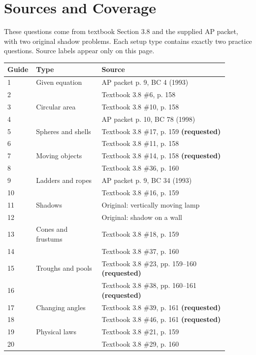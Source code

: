 \documentclass[11pt]{article}
\begin{document}
\section*{Sources and Coverage}
These questions come from textbook Section 3.8 and the supplied AP packet, with two original shadow problems. Each setup type contains exactly two practice questions. Source labels appear only on this page.
\par\medskip
\renewcommand{\arraystretch}{1.4}
\begin{tabular}{@{}p{0.07\linewidth}p{0.28\linewidth}p{0.54\linewidth}@{}}
\toprule
\textbf{Guide} & \textbf{Type} & \textbf{Source}\\
\midrule
1 & Given equation & AP packet p. 9, BC 4 (1993)\\
2 & & Textbook 3.8 \#6, p. 158\\
3 & Circular area & Textbook 3.8 \#10, p. 158\\
4 & & AP packet p. 10, BC 78 (1998)\\
5 & Spheres and shells & Textbook 3.8 \#17, p. 159 \textbf{(requested)}\\
6 & & Textbook 3.8 \#11, p. 158\\
7 & Moving objects & Textbook 3.8 \#14, p. 158 \textbf{(requested)}\\
8 & & Textbook 3.8 \#36, p. 160\\
9 & Ladders and ropes & AP packet p. 9, BC 34 (1993)\\
10 & & Textbook 3.8 \#16, p. 159\\
11 & Shadows & Original: vertically moving lamp\\
12 & & Original: shadow on a wall\\
13 & Cones and frustums & Textbook 3.8 \#18, p. 159\\
14 & & Textbook 3.8 \#37, p. 160\\
15 & Troughs and pools & Textbook 3.8 \#23, pp. 159--160 \textbf{(requested)}\\
16 & & Textbook 3.8 \#38, pp. 160--161 \textbf{(requested)}\\
17 & Changing angles & Textbook 3.8 \#39, p. 161 \textbf{(requested)}\\
18 & & Textbook 3.8 \#46, p. 161 \textbf{(requested)}\\
19 & Physical laws & Textbook 3.8 \#21, p. 159\\
20 & & Textbook 3.8 \#29, p. 160\\
\bottomrule
\end{tabular}
\end{document}
